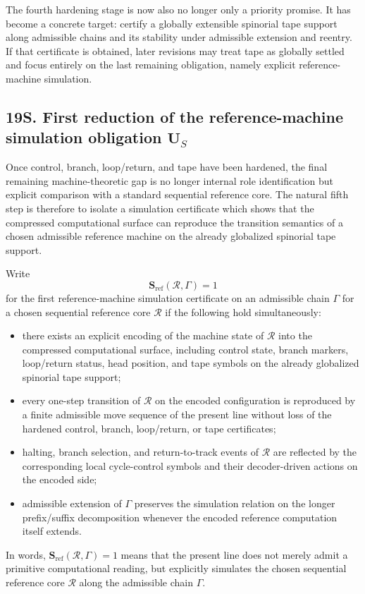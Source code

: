 \begin{corollary}
The fourth hardening stage is now also no longer only a priority promise. It has become a concrete target: certify a globally extensible spinorial tape support along admissible chains and its stability under admissible extension and reentry. If that certificate is obtained, later revisions may treat tape as globally settled and focus entirely on the last remaining obligation, namely explicit reference-machine simulation.
\end{corollary}


\subsection*{19S. First reduction of the reference-machine simulation obligation $\mathbf U_S$}
Once control, branch, loop/return, and tape have been hardened, the final remaining machine-theoretic gap is no longer internal role identification but explicit comparison with a standard sequential reference core. The natural fifth step is therefore to isolate a simulation certificate which shows that the compressed computational surface can reproduce the transition semantics of a chosen admissible reference machine on the already globalized spinorial tape support.

\begin{definition}
Write
\[
\mathbf S_{\mathrm{ref}}(\mathcal R,\Gamma)=1
\]
for the first reference-machine simulation certificate on an admissible chain $\Gamma$ for a chosen sequential reference core $\mathcal R$ if the following hold simultaneously:
\begin{itemize}[leftmargin=2em]
  \item there exists an explicit encoding of the machine state of $\mathcal R$ into the compressed computational surface, including control state, branch markers, loop/return status, head position, and tape symbols on the already globalized spinorial tape support;
  \item every one-step transition of $\mathcal R$ on the encoded configuration is reproduced by a finite admissible move sequence of the present line without loss of the hardened control, branch, loop/return, or tape certificates;
  \item halting, branch selection, and return-to-track events of $\mathcal R$ are reflected by the corresponding local cycle-control symbols and their decoder-driven actions on the encoded side;
  \item admissible extension of $\Gamma$ preserves the simulation relation on the longer prefix/suffix decomposition whenever the encoded reference computation itself extends.
\end{itemize}
In words, $\mathbf S_{\mathrm{ref}}(\mathcal R,\Gamma)=1$ means that the present line does not merely admit a primitive computational reading, but explicitly simulates the chosen sequential reference core $\mathcal R$ along the admissible chain $\Gamma$.
\end{definition}

